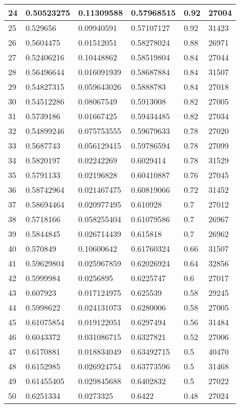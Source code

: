 \begin{longtable}{|l|l|l|l|l|l|}
24 & 0.50523275 & 0.11309588 & 0.57968515 & 0.92 & 27004 \\ \hline 
25 & 0.529656 & 0.09940591 & 0.57107127 & 0.92 & 31423 \\ \hline 
26 & 0.5604475 & 0.01512051 & 0.58278024 & 0.88 & 26971 \\ \hline 
27 & 0.52406216 & 0.10448862 & 0.58519804 & 0.84 & 27044 \\ \hline 
28 & 0.56496644 & 0.016091939 & 0.58687884 & 0.84 & 31507 \\ \hline 
29 & 0.54827315 & 0.059643026 & 0.5888783 & 0.84 & 27018 \\ \hline 
30 & 0.54512286 & 0.08067549 & 0.5913008 & 0.82 & 27005 \\ \hline 
31 & 0.5739186 & 0.01667425 & 0.59434485 & 0.82 & 27034 \\ \hline 
32 & 0.54899246 & 0.075753555 & 0.59679633 & 0.78 & 27020 \\ \hline 
33 & 0.5687743 & 0.056129415 & 0.59786594 & 0.78 & 27099 \\ \hline 
34 & 0.5820197 & 0.02242269 & 0.6029414 & 0.78 & 31529 \\ \hline 
35 & 0.5791133 & 0.02196828 & 0.60410887 & 0.76 & 27045 \\ \hline 
36 & 0.58742964 & 0.021467475 & 0.60819066 & 0.72 & 31452 \\ \hline 
37 & 0.58694464 & 0.020977495 & 0.610928 & 0.7 & 27012 \\ \hline 
38 & 0.5718166 & 0.058255404 & 0.61079586 & 0.7 & 26967 \\ \hline 
39 & 0.5844845 & 0.026714439 & 0.615818 & 0.7 & 26962 \\ \hline 
40 & 0.570849 & 0.10600642 & 0.61760324 & 0.66 & 31507 \\ \hline 
41 & 0.59629804 & 0.025967859 & 0.62026924 & 0.64 & 32856 \\ \hline 
42 & 0.5999984 & 0.0256895 & 0.6225747 & 0.6 & 27017 \\ \hline 
43 & 0.607923 & 0.017124975 & 0.625539 & 0.58 & 29245 \\ \hline 
44 & 0.5998622 & 0.024131073 & 0.6280006 & 0.58 & 27005 \\ \hline 
45 & 0.61075854 & 0.019122051 & 0.6297494 & 0.56 & 31484 \\ \hline 
46 & 0.6043372 & 0.031086715 & 0.6327821 & 0.52 & 27006 \\ \hline 
47 & 0.6170881 & 0.018834049 & 0.63492715 & 0.5 & 40470 \\ \hline 
48 & 0.6152985 & 0.026924754 & 0.63773596 & 0.5 & 31468 \\ \hline 
49 & 0.61455405 & 0.029845688 & 0.6402832 & 0.5 & 27022 \\ \hline 
50 & 0.6251334 & 0.0273325 & 0.6422 & 0.48 & 27024 \\ \hline 
\end{longtable}